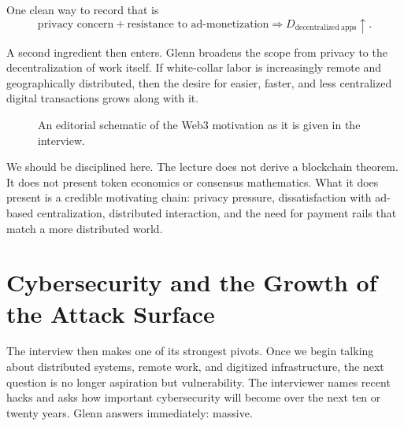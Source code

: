 One clean way to record that is
\begin{equation}
\text{privacy concern} + \text{resistance to ad-monetization}
\Longrightarrow D_{\mathrm{decentralized\ apps}}\uparrow.
\end{equation}

A second ingredient then enters. Glenn broadens the scope from privacy to the decentralization of work itself. If white-collar labor is increasingly remote and geographically distributed, then the desire for easier, faster, and less centralized digital transactions grows along with it.

\begin{figure}[h]
\centering
{}
\caption{An editorial schematic of the Web3 motivation as it is given in the interview.}
\end{figure}

We should be disciplined here. The lecture does not derive a blockchain theorem. It does not present token economics or consensus mathematics. What it does present is a credible motivating chain: privacy pressure, dissatisfaction with ad-based centralization, distributed interaction, and the need for payment rails that match a more distributed world.

\section{Cybersecurity and the Growth of the Attack Surface}

The interview then makes one of its strongest pivots. Once we begin talking about distributed systems, remote work, and digitized infrastructure, the next question is no longer aspiration but vulnerability. The interviewer names recent hacks and asks how important cybersecurity will become over the next ten or twenty years. Glenn answers immediately: massive.

